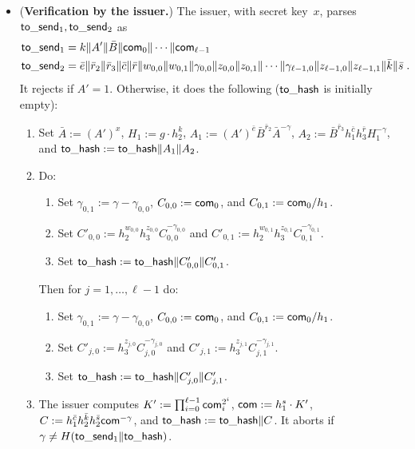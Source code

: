 \documentclass[11pt]{article}
\def\com{{\sf com}}
\def\send{{\sf to}\mbox{\_}{\sf send}}
\def\hash{{\sf to}\mbox{\_}{\sf hash}}
\begin{document}
\begin{itemize}
\begin{enumerate}
    \end{enumerate}
            \item ({\bf Verification by the issuer.}) The issuer, with secret key~$x$, parses $\send_1, \send_2$ as
            \begin{eqnarray*} & \send_1 = k\|A'\|\bar B\|\com_0\|\cdots\|\com_{\ell-1} & \\
            &\send_2 = \bar e \| \bar r_2\|\bar r_3\|\bar c \| \bar r\| w_{0,0}\|w_{0,1}\| \gamma_{0,0}\|z_{0,0}\|z_{0,1}\|\cdots \| \gamma_{\ell-1,0}\|z_{\ell-1,0}\|z_{\ell-1,1}\|\bar k\|\bar s \; .&
            \end{eqnarray*}
It rejects if $A'=1$. Otherwise, it does the following ($\hash$ is initially empty):
\begin{enumerate}
    \item Set $\bar A:=(A')^x$, $H_1:=g \cdot h_2^k$, $A_1:= (A')^{\bar e} \bar B^{\bar r_2} \bar A^{-\gamma}$, $A_2:= \bar B^{\bar r_3} h_1^{\bar c} h_3^{\bar r} H_1^{-\gamma}$, and $\hash:=\hash\|A_1\|A_2$. 
    \item Do:
           \begin{enumerate}
           \item Set $\gamma_{0,1}:=\gamma-\gamma_{0,0}$, $C_{0,0}:=\com_0$, and  $C_{0,1}:=\com_0/h_1$.
           \item Set $C'_{0,0}:=h_2^{w_{0,0}} h_3^{z_{0,0}} C_{0,0}^{-\gamma_{0,0}}$ and $C'_{0,1}:=h_2^{w_{0,1}} h_3^{z_{0,1}}C_{0,1}^{-\gamma_{0,1}}$.
           \item Set $\hash:=\hash\|C'_{0,0}\|C'_{0,1}$.
       \end{enumerate}
       Then for $j=1, \ldots, \ell-1$ do:
              \begin{enumerate}
           \item Set $\gamma_{0,1}:=\gamma-\gamma_{0,0}$, $C_{0,0}:=\com_0$, and  $C_{0,1}:=\com_0/h_1$.
           \item Set $C'_{j,0}:=h_3^{z_{j,0}} C_{j,0}^{-\gamma_{j,0}}$ and $C'_{j,1}:=h_3^{z_{j,1}}C_{j,1}^{-\gamma_{j,1}}$.
           \item Set $\hash:=\hash\|C'_{j,0}\|C'_{j,1}$.
       \end{enumerate}
       \item The issuer computes $K':=\prod_{i=0}^{\ell-1} \com_i^{2^i}$, $\com:=h_1^s\cdot K'$, $C:=h_1^{\bar c} h_2^{\bar k} h_2^{\bar s} \com^{-\gamma}$, and $\hash:=\hash\|C$. It aborts if $\gamma \neq H(\send_1\|\hash)$.
\end{enumerate}


\end{itemize}
\end{document}
